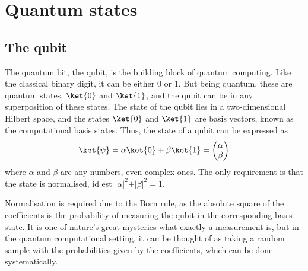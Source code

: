 \section{Quantum states}
\subsection{The qubit}
The quantum bit, the qubit, is the building block of quantum computing.
Like the classical binary digit, it can be either 0 or 1.
But being quantum, these are quantum states, $\ket{0}$ and $\ket{1}$\footnotemark{}, and the qubit can be in any superposition of these states.
The state of the qubit lies in a two-dimensional Hilbert space, and the states $\ket{0}$ and $\ket{1}$ are basis vectors, known as the computational basis states.
Thus, the state of a qubit can be expressed as
\begin{equation}
    \ket{\psi} = \alpha \ket{0} + \beta \ket{1} = \begin{pmatrix} \alpha \\ \beta \end{pmatrix}
    \label{eq:qubit}
\end{equation}
where $\alpha$ and $\beta$ are any numbers, even complex ones.
The only requirement is that the state is normalised, id est $\vert\alpha\vert^2 + \vert\beta\vert^2 = 1$.


Normalisation is required due to the Born rule, as the absolute square of the coefficients is the probability of measuring the qubit in the corresponding basis state.
It is one of nature's great mysteries what exactly a measurement is, but in the quantum computational setting, it can be thought of as taking a random sample with the probabilities given by the coefficients, which can be done systematically.

